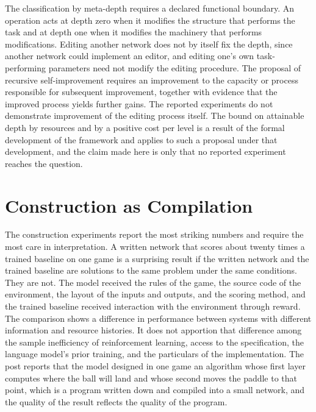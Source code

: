 \documentclass[11pt]{article}
\begin{document}
The classification by meta-depth requires a declared functional boundary. An operation acts at depth zero when it modifies the structure that performs the task and at depth one when it modifies the machinery that performs modifications. Editing another network does not by itself fix the depth, since another network could implement an editor, and editing one's own task-performing parameters need not modify the editing procedure. The proposal of recursive self-improvement requires an improvement to the capacity or process responsible for subsequent improvement, together with evidence that the improved process yields further gains. The reported experiments do not demonstrate improvement of the editing process itself. The bound on attainable depth by resources and by a positive cost per level is a result of the formal development of the framework and applies to such a proposal under that development, and the claim made here is only that no reported experiment reaches the question.

\section{Construction as Compilation}

The construction experiments report the most striking numbers and require the most care in interpretation. A written network that scores about twenty times a trained baseline on one game is a surprising result if the written network and the trained baseline are solutions to the same problem under the same conditions. They are not. The model received the rules of the game, the source code of the environment, the layout of the inputs and outputs, and the scoring method, and the trained baseline received interaction with the environment through reward. The comparison shows a difference in performance between systems with different information and resource histories. It does not apportion that difference among the sample inefficiency of reinforcement learning, access to the specification, the language model's prior training, and the particulars of the implementation. The post reports that the model designed in one game an algorithm whose first layer computes where the ball will land and whose second moves the paddle to that point, which is a program written down and compiled into a small network, and the quality of the result reflects the quality of the program.
\end{document}
